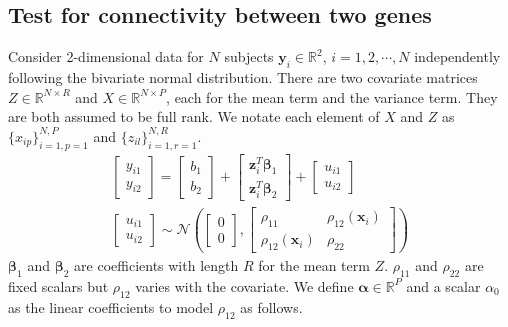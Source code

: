 \documentclass[aap,authoryear, preprint]{imsart}
\numberwithin{equation}{section}
\theoremstyle{plain}
\begin{document}
\subsection{Test for connectivity between two genes \label{sec:framework2}}
Consider 2-dimensional data for $N$ subjects $\bm{y}_i \in \mathbb{R}^2$, $i = 1, 2, \cdots, N$ independently following the bivariate normal distribution. There are two covariate matrices $Z \in \mathbb{R}^{N \times R}$ and $X \in \mathbb{R}^{N \times P}$, each for the mean term and the variance term. They are both assumed to be full rank. We notate each element of $X$ and $Z$ as $\{x_{ip}\}_{i=1,p=1}^{N,P}$ and $\{z_{il}\}_{i=1,r=1}^{N,R}$.
\begin{equation}
\begin{multlined}
    \begin{bmatrix} y_{i1} \\ y_{i2} \end{bmatrix} = 
    \begin{bmatrix} b_{1} \\ b_{2} \end{bmatrix} + 
    \begin{bmatrix} \bm{z}_i^T \bm{\beta}_1 \\ \bm{z}_i^T \bm{\beta}_2 \end{bmatrix} + 
    \begin{bmatrix} {u_{i1}} \\ {u_{i2}} \end{bmatrix}\\
    \begin{bmatrix} {u_{i1}} \\ u_{i2} \end{bmatrix} 
    \sim \mathcal{N}\left(
        \begin{bmatrix} 0 \\ 0 \end{bmatrix}, 
        \begin{bmatrix} \rho_{11} & \rho_{12}(\bm{x}_i) \\ 
        \rho_{12}(\bm{x}_i) & \rho_{22} \end{bmatrix}
    \right)
    \end{multlined}
    \label{eq:framework_2genes}
\end{equation}
$\bm{\beta}_1$ and $\bm{\beta}_2$ are coefficients with length $R$  for the mean term $Z$. $\rho_{11}$ and $\rho_{22}$ are fixed scalars but $\rho_{12}$ varies with the covariate. We define $\bm{\alpha} \in \mathbb{R}^{P}$ and a scalar $\alpha_0$ as the linear coefficients to model $\rho_{12}$ as follows.
\end{document}
